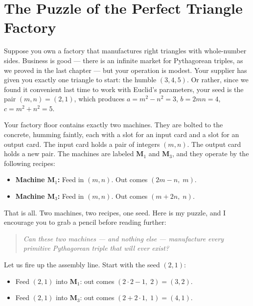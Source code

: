 \documentclass[11pt,openany]{book}
\theoremstyle{definition}
\theoremstyle{plain}
\theoremstyle{remark}
\begin{document}
\section*{The Puzzle of the Perfect Triangle Factory}


Suppose you own a factory that manufactures right triangles with whole-number sides. Business is good — there is an infinite market for Pythagorean triples, as we proved in the last chapter — but your operation is modest. Your supplier has given you exactly one triangle to start: the humble $(3, 4, 5)$. Or rather, since we found it convenient last time to work with Euclid's parameters, your seed is the pair $(m, n) = (2, 1)$, which produces $a = m^2 - n^2 = 3$, $b = 2mn = 4$, $c = m^2 + n^2 = 5$.

Your factory floor contains exactly two machines. They are bolted to the concrete, humming faintly, each with a slot for an input card and a slot for an output card. The input card holds a pair of integers $(m, n)$. The output card holds a new pair. The machines are labeled $\mathbf{M}_1$ and $\mathbf{M}_3$, and they operate by the following recipes:

\begin{itemize}
\item \textbf{Machine $\mathbf{M}_1$:} Feed in $(m, n)$. Out comes $(2m - n,\; m)$.
\item \textbf{Machine $\mathbf{M}_3$:} Feed in $(m, n)$. Out comes $(m + 2n,\; n)$.
\end{itemize}

That is all. Two machines, two recipes, one seed. Here is my puzzle, and I encourage you to grab a pencil before reading further:

\begin{quote}
\textit{Can these two machines — and nothing else — manufacture every primitive Pythagorean triple that will ever exist?}
\end{quote}


Let us fire up the assembly line. Start with the seed $(2, 1)$:

\begin{itemize}
\item Feed $(2, 1)$ into $\mathbf{M}_1$: out comes $(2 \cdot 2 - 1,\; 2) = (3, 2)$.
\item Feed $(2, 1)$ into $\mathbf{M}_3$: out comes $(2 + 2 \cdot 1,\; 1) = (4, 1)$.
\end{itemize}
\end{document}
